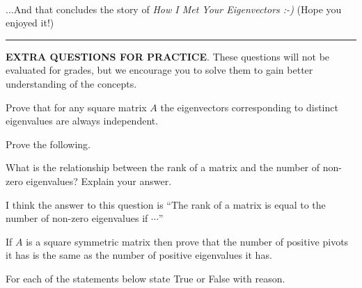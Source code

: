 \documentclass[solution,addpoints,12pt]{exam}
\begin{document}
\begin{questions}
\begin{solution}
\end{solution}


~\\...And that concludes the story of \textit{How I Met Your Eigenvectors :-)} (Hope you enjoyed it!)


\vspace{5mm}

\par\noindent\rule{\textwidth}{0.4pt}

\vspace{3mm}

\textbf{EXTRA QUESTIONS FOR PRACTICE}. These questions will not be evaluated for grades, but we encourage you to solve them to gain better understanding of the concepts. 


\question[0] Prove that for any square matrix $A$ the eigenvectors corresponding to distinct eigenvalues are always independent. 


\question[0] Prove the following. 

\question[0] What is the relationship between the rank of a matrix and the number of non-zero eigenvalues? Explain your answer.
\begin{solution}
I think the answer to this question is ``The rank of a matrix is equal to the number of non-zero eigenvalues if $\cdots$''
\end{solution}


\question[0] If $A$ is a square symmetric matrix then prove that the number of positive pivots it has is the same as the number of positive eigenvalues it has. 



\question[0] For each of the statements below state True or False with reason.

\end{questions}
\end{document}
